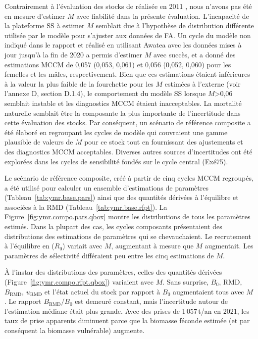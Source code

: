 \documentclass[11pt]{book}
\newcommand{\Bmsy}{B_\text{RMD}}
\newcommand{\umsy}{u_\text{RMD}}
\begin{document}
Contrairement \`{a} l'\'{e}valuation des stocks de \SPC{} r\'{e}alis\'{e}e en 2011 \citep{Edwards-etal:2012_ymr}, nous n'avons pas \'{e}t\'{e} en mesure d'estimer $M$ avec fiabilit\'{e} dans la pr\'{e}sente \'{e}valuation.
L'incapacit\'{e} de la plateforme SS \`{a} estimer $M$ semblait due \`{a} l'hypoth\`{e}se de distribution diff\'{e}rente utilis\'{e}e par le mod\`{e}le pour s'ajuster aux donn\'{e}es de FA.
Un cycle du mod\`{e}le non indiqu\'{e} dans le rapport et r\'{e}alis\'{e} en utilisant Awatea avec les donn\'{e}es mises \`{a} jour jusqu'\`{a} la fin de 2020 a permis d'estimer $M$ avec succ\`{e}s, et a donn\'{e} des estimations MCCM de 0,057 (0,053, 0,061) et 0,056 (0,052, 0,060) pour les femelles et les m\^{a}les, respectivement.
Bien que ces estimations \'{e}taient inf\'{e}rieures \`{a} la valeur la plus faible  de la fourchette pour les $M$ estim\'{e}es \`{a} l'externe (voir l'annexe D, section D.1.4), le comportement du mod\`{e}le SS lorsque $M$>0,06 semblait instable et les diagnostics MCCM \'{e}taient inacceptables.
La mortalit\'{e} naturelle semblait \^{e}tre la composante la plus importante de l'incertitude dans cette \'{e}valuation des stocks.
Par cons\'{e}quent, un sc\'{e}nario de r\'{e}f\'{e}rence composite a \'{e}t\'{e} \'{e}labor\'{e} en regroupant les cycles de mod\`{e}le qui couvraient une gamme plausible de valeurs de $M$ pour ce stock tout en fournissant des ajustements et des diagnostics MCCM acceptables.
Diverses autres sources d'incertitudes ont \'{e}t\'{e} explor\'{e}es dans les cycles de sensibilit\'{e} fond\'{e}s sur le cycle central (Ex\'{e}75). 

Le sc\'{e}nario de r\'{e}f\'{e}rence composite, cr\'{e}\'{e} \`{a} partir de cinq cycles MCCM regroup\'{e}s, a \'{e}t\'{e} utilis\'{e} pour calculer un ensemble d'estimations de param\`{e}tres (Tableau~\ref{tab:ymr.base.pars}) ainsi que des quantit\'{e}s d\'{e}riv\'{e}es \`{a} l'\'{e}quilibre et associ\'{e}es \`{a} la RMD (Tableau~\ref{tab:ymr.base.rfpt}).
La Figure~\ref{fig:ymr.compo.pars.qbox} montre les distributions de tous les param\`{e}tres estim\'{e}s.
Dans la plupart des cas, les cycles composants pr\'{e}sentaient des distributions des estimations de param\`{e}tres qui se chevauchaient.
Le recrutement \`{a} l'\'{e}quilibre en \startYear{} ($R_0$) variait avec $M$, augmentant \`{a} mesure que $M$ augmentait.
Les param\`{e}tres de s\'{e}lectivit\'{e} diff\'{e}raient peu entre les cinq estimations de $M$.

\`{A} l'instar des distributions des param\`{e}tres, celles des quantit\'{e}s d\'{e}riv\'{e}es (Figure~\ref{fig:ymr.compo.rfpt.qbox}) variaient avec $M$.
Sans surprise, $B_0$, RMD, $\Bmsy$, $\umsy$ et l'\'{e}tat actuel du stock par rapport \`{a} $B_0$ augmentaient tous avec $M$.
Le rapport $\Bmsy/B_0$ est demeur\'{e} constant, mais l'incertitude autour de l'estimation m\'{e}diane \'{e}tait plus grande.
Avec des prises de 1\,057\,t/an en 2021, les taux de prise apparents diminuent parce que la biomasse f\'{e}conde estim\'{e}e (et par cons\'{e}quent la biomasse vuln\'{e}rable) augmente.
\end{document}
